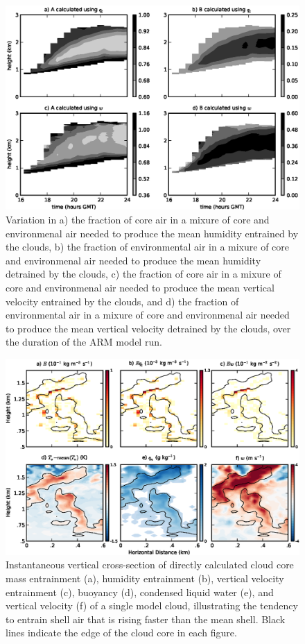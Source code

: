 \documentclass[12pt]{article}
\begin{document}
\begin{figure}[t]
  \noindent\includegraphics[width=39pc]{./figures/shell_variability}
  \caption{Variation in a) the fraction of core air in a mixure of core and 
environmenal air needed to produce the mean humidity entrained by the clouds,  
  b) the fraction of environmental air in a mixure of core and environmenal air 
needed to produce the mean humidity detrained by the clouds,  
  c) the fraction of core air in a mixure of core and environmenal air needed 
to produce the mean vertical velocity entrained by the clouds, and 
  d) the fraction of environmental air in a mixure of core and environmenal air 
needed to produce the mean vertical velocity detrained by the clouds, over the 
duration of the ARM model run.
  }
  \label{fig:shell_variability}
\end{figure}

\begin{figure}[t]
  \noindent\includegraphics[width=39pc]{./figures/w_entrainment_example}
  \caption{Instantaneous vertical cross-section of directly calculated cloud 
  core mass entrainment (a), humidity entrainment (b), vertical velocity
  entrainment (c), buoyancy (d), condensed liquid water (e), and vertical
  velocity (f) of a single model cloud, illustrating the tendency to entrain 
  shell air that is rising faster than the mean shell.  Black lines indicate 
  the edge of the cloud core in each figure.}
  \label{fig:w_entrainment_example}
\end{figure}
\end{document}
